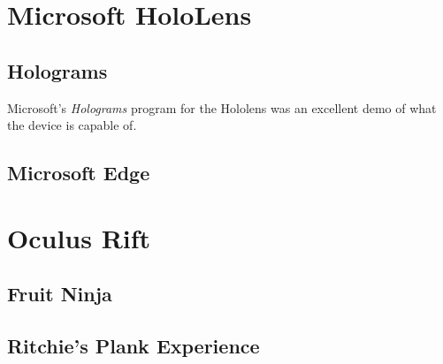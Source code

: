 \documentclass[11pt]{article}
\begin{document}
\section{Microsoft HoloLens}
\subsection{Holograms}
Microsoft's \textit{Holograms} program for the Hololens was an excellent demo of what the 
device is capable of. 
\subsection{Microsoft Edge}
\section{Oculus Rift}
\subsection{Fruit Ninja}
\subsection{Ritchie's Plank Experience}
\end{document}
